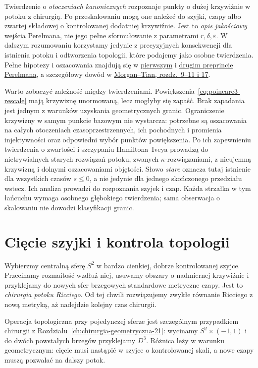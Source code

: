 Twierdzenie o \emph{otoczeniach kanonicznych}
rozpoznaje punkty o dużej krzywiźnie w potoku
z chirurgią. Po przeskalowaniu mogą one należeć
do szyjki, czapy albo zwartej składowej
o kontrolowanej dodatniej krzywiźnie.
Jest to \emph{opis jakościowy} wejścia
Perelmana, nie jego pełne sformułowanie
z parametrami $r,\delta,\varepsilon$.
W dalszym rozumowaniu korzystamy jedynie
z precyzyjnych konsekwencji dla istnienia
potoku i odtworzenia topologii, które
podajemy jako osobne twierdzenia.
Pełne hipotezy i oszacowania znajdują się
w \href{https://arxiv.org/pdf/math/0211159}
{pierwszym} i
\href{https://arxiv.org/pdf/math/0303109}
{drugim preprincie Perelmana}, a szczegółowy
dowód w
\href{https://www.claymath.org/library/monographs/cmim03.pdf}
{Morgan--Tian, rozdz.\ 9--11 i 17}.

Warto zobaczyć zależność między twierdzeniami.
Powiększenia~\eqref{eq:poincare3-rescale} mają
krzywiznę unormowaną, lecz mogłyby się zapaść.
Brak zapadania jest jednym z warunków uzyskania geometrycznych
granic. Ograniczenie krzywizny w samym punkcie bazowym
nie wystarcza: potrzebne są oszacowania na całych
otoczeniach czasoprzestrzennych, ich pochodnych i promienia
injektywności oraz odpowiedni wybór punktów powiększenia.
Po ich zapewnieniu twierdzenia o zwartości i szczypaniu
Hamiltona--Iveya prowadzą do nietrywialnych starych
rozwiązań potoku, zwanych $\kappa$-rozwiązaniami,
z nieujemną krzywizną i dolnymi oszacowaniami objętości.
Słowo \emph{stare} oznacza tutaj istnienie dla wszystkich
czasów $s\leq0$, a nie jedynie dla jednego skończonego
przedziału wstecz.
Ich analiza prowadzi do rozpoznania szyjek i czap.
Każda strzałka w tym łańcuchu wymaga osobnego
głębokiego twierdzenia; sama obserwacja o skalowaniu
nie dowodzi klasyfikacji granic.

\section{Cięcie szyjki i kontrola topologii}
\label{sec:poincare3-chirurgia}

Wybierzmy centralną sferę $S^2$ w bardzo cienkiej,
dobrze kontrolowanej szyjce. Przecinamy
rozmaitość wzdłuż niej, usuwamy obszary
o nadmiernej krzywiźnie i przyklejamy
do nowych sfer brzegowych standardowe
metryczne czapy. Jest to \emph{chirurgia
potoku Ricciego}. Od tej chwili rozwiązujemy
zwykłe równanie Ricciego z nową metryką,
aż nadejdzie kolejny czas chirurgii.

Operacja topologiczna przy pojedynczej sferze
jest szczególnym przypadkiem chirurgii
z Rozdziału~\ref{ch:chirurgia-geometryczna-21}:
wycinamy $S^2\times(-1,1)$ i do dwóch
powstałych brzegów przyklejamy $D^3$.
Różnica leży w warunku geometrycznym:
cięcie musi nastąpić w szyjce o kontrolowanej
skali, a nowe czapy muszą pozwalać na dalszy potok.

